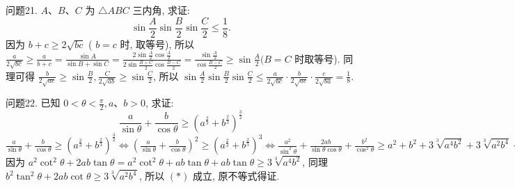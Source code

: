 问题21. $ A 、 B 、 C$ 为 $\triangle A B C$ 三内角, 求证:
$$
\sin \frac{A}{2} \sin \frac{B}{2} \sin \frac{C}{2} \leqslant \frac{1}{8} .
$$
因为 $b+c \geqslant 2 \sqrt{b c}$ ( $b=c$ 时, 取等号), 所以 $\frac{a}{2 \sqrt{b c}} \geqslant \frac{a}{b+c}= \frac{\sin A}{\sin B+\sin C}=\frac{2 \sin \frac{A}{2} \cos \frac{A}{2}}{2 \sin \frac{B+C}{2} \cos \frac{B-C}{2}}=\frac{\sin \frac{A}{2}}{\cos \frac{B-C}{2}} \geqslant \sin \frac{A}{2}(B=C$ 时取等号). 同理可得 $\frac{b}{2 \sqrt{a c}} \geqslant \sin \frac{B}{2}, \frac{C}{2 \sqrt{a b}} \geqslant \sin \frac{C}{2}$, 所以 $\sin \frac{A}{2} \sin \frac{B}{2} \sin \frac{C}{2} \leqslant \frac{a}{2 \sqrt{b c}} \cdot \frac{b}{2 \sqrt{a c}} \cdot \frac{c}{2 \sqrt{b a}}=\frac{1}{8}$.



问题22. 已知 $0<\theta<\frac{\pi}{2}, a 、 b>0$, 求证:
$$
\frac{a}{\sin \theta}+\frac{b}{\cos \theta} \geqslant\left(a^{\frac{2}{3}}+b^{\frac{2}{3}}\right)^{\frac{3}{2}}
$$
$\frac{a}{\sin \theta}+\frac{b}{\cos \theta} \geqslant\left(a^{\frac{2}{3}}+b^{\frac{2}{3}}\right)^{\frac{3}{2}} \Leftrightarrow\left(\frac{a}{\sin \theta}+\frac{b}{\cos \theta}\right)^2 \geqslant\left(a^{\frac{2}{3}}+b^{\frac{2}{3}}\right)^3 \Leftrightarrow \frac{a^2}{\sin ^2 \theta}+\frac{2 a b}{\sin \theta \cos \theta}+\frac{b^2}{\cos ^2 \theta} \geqslant a^2+b^2+3 \sqrt[3]{a^4 b^2}+3 \sqrt[3]{a^2 b^4} \Leftrightarrow a^2 \cot ^2 \theta+ b^2 \tan ^2 \theta+2 a b \frac{\sin ^2 \theta+\cos ^2 \theta}{\sin \theta \cos \theta} \geqslant 3 \sqrt[3]{a^4 b^2}+3 \sqrt[3]{a^2 b^4} \Leftrightarrow a^2 \cot ^2 \theta+b^2 \tan ^2 \theta+ 2 a b \tan \theta+2 a b \cot \theta \geqslant 3 \sqrt[3]{a^4 b^2}+3 \sqrt[3]{\sqrt{a^2 b^4}},(*)$ 因为 $a^2 \cot ^2 \theta+2 a b \tan \theta= a^2 \cot ^2 \theta+a b \tan \theta+a b \tan \theta \geqslant 3 \sqrt[3]{a^4 b^2}$, 同理 $b^2 \tan ^2 \theta+2 a b \cot \theta \geqslant 3 \sqrt[3]{a^2 b^4}$, 所以 $(*)$ 成立, 原不等式得证.



